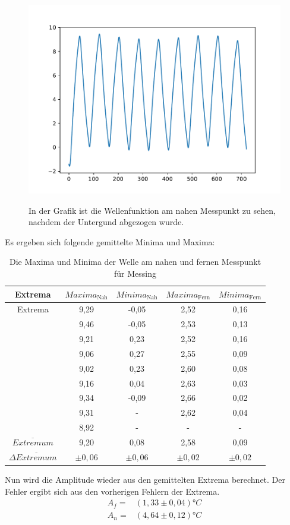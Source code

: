 \documentclass[titlepage = firstcover]{scrartcl}
\begin{document}
    \begin{figure}[h]
      \centering
      \caption{In der Grafik ist die Wellenfunktion am nahen Messpunkt zu sehen, nachdem der Untergund abgezogen wurde.}
      \includegraphics{AmpMesbreitNah.pdf}
      \label{fig:AmpMesNah}
    \end{figure}

  Es ergeben sich folgende gemittelte Minima und Maxima:

  \begin{table}[h]
    \centering
    \caption{Die Maxima und Minima der Welle am nahen und fernen Messpunkt für Messing}
    \label{tab:AmplitudeMes}
    \begin{tabular}{c c c c c}
      \toprule
      {Extrema} & $Maxima_{\text{Nah}}$ & $Minima_{\text{Nah}}$ & $Maxima_{\text{Fern}}$ & $Minima_{\text{Fern}}$ \\
      \midrule
      Extrema &9,29 &-0,05 &2,52 &0,16 \\
              &9,46 &-0,05 &2,53 &0,13 \\
              &9,21 &0,23  &2,52 &0,16 \\
              &9,06 &0,27  &2,55 &0,09 \\
              &9,02 &0,23  &2,60 &0,08 \\
              &9,16 &0,04  &2,63 &0,03 \\
              &9,34 &-0,09 &2,66 &0,02 \\
              &9,31 & -    &2,62 &0,04 \\
              &8,92 & -    &-    &-    \\
  $\overline{Extremum}$ & 9,20 & 0,08  &   2,58  & 0,09 \\
  $\Delta \overline{Extremum}$ & $\pm 0,06 $ & $\pm 0,06$  & $\pm 0,02$  & $\pm 0,02$ \\

      \bottomrule
    \end{tabular}   
  \end{table}
  Nun wird die Amplitude wieder aus den gemittelten Extrema berechnet. Der Fehler ergibt sich aus den vorherigen Fehlern der Extrema.
  \begin{align*}
    A_f =& (1,33 \pm 0,04) °C\\
    A_n =& (4,64 \pm 0,12) °C
  \end{align*}
\end{document}
